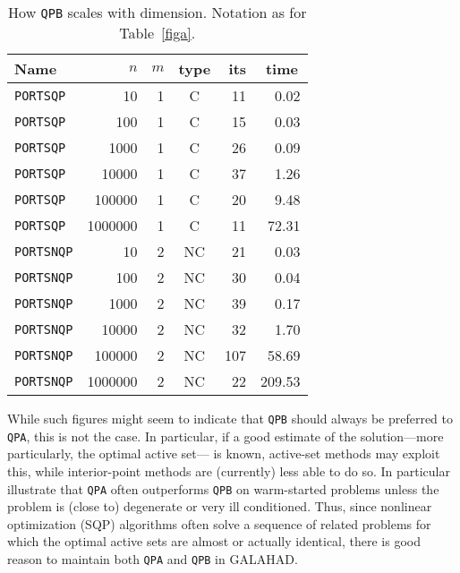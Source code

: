 \documentclass[twoside]{article}
\newcommand{\gal}{{\sf GALAHAD}}
\begin{document}
\begin{table}[htb]
\begin{center}
\begin{tabular}[c]{|lrrc|rr|}
\hline
Name      & $n$ & $m$ & type & its & time\, \\
\hline
{\tt PORTSQP}  & 10 & 1  & C & 11    & {0.02} \\
{\tt PORTSQP}  & 100 & 1  & C &  15   & {0.03} \\
{\tt PORTSQP}  & 1000 & 1  & C &  26   & {0.09} \\
{\tt PORTSQP}  & 10000 & 1  & C &  37   & {1.26} \\
{\tt PORTSQP}  & 100000 & 1  & C &  20   & {9.48} \\
{\tt PORTSQP}  & 1000000 & 1  & C &  11   & {72.31} \\
\hline
{\tt PORTSNQP}  & 10 & 2  & NC & 21    & {0.03} \\
{\tt PORTSNQP}  & 100 & 2  & NC &  30   & {0.04} \\
{\tt PORTSNQP}  & 1000 & 2  & NC &  39   & {0.17} \\
{\tt PORTSNQP}  & 10000 & 2  & NC &  32   & {1.70} \\
{\tt PORTSNQP}  & 100000 & 2  & NC &  107   & { 58.69} \\
{\tt PORTSNQP}  & 1000000 & 2  & NC &  22   & {209.53} \\
\hline
\end{tabular}
\end{center}
\caption{\label{figb} How {\tt QPB} scales with dimension.
Notation as for Table~\ref{figa}.}
\end{table}

While such figures might seem to indicate that {\tt QPB} should always
be preferred to {\tt QPA}, this is not the case. In particular, if a
good estimate of the solution---more particularly, the optimal active set---
is known, active-set methods may exploit this, while interior-point methods
are (currently) less able to do so. In particular
 illustrate that {\tt QPA} often outperforms {\tt QPB}
on warm-started problems unless the problem is (close to) degenerate or
very ill conditioned. Thus, since nonlinear optimization (SQP) algorithms 
often solve a sequence of related problems for which the optimal active sets
are almost or actually identical, there is good reason to maintain both
{\tt QPA} and {\tt QPB} in \gal.
\end{document}
